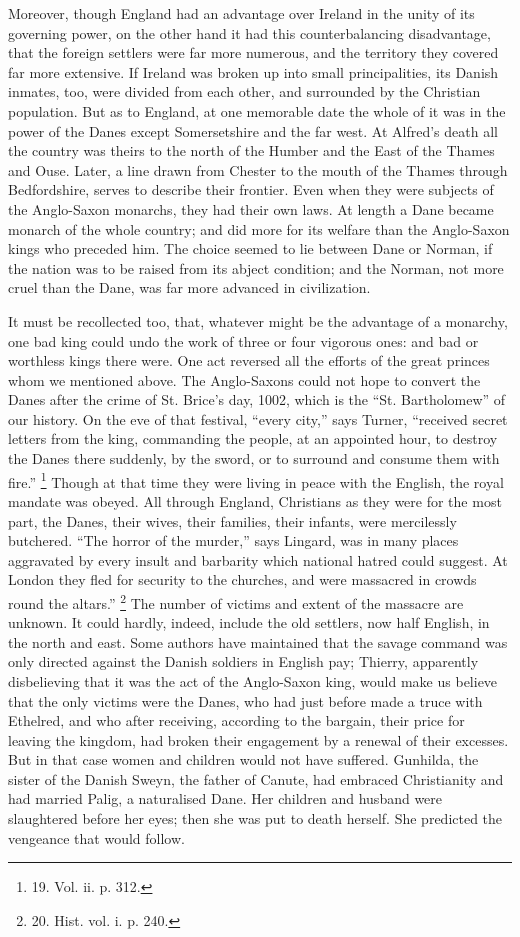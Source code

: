Moreover, though England had
an advantage over Ireland in the unity of its governing power, on the
other hand it had this counterbalancing disadvantage, that the foreign
settlers were far more numerous, and the territory they covered far
more extensive. If Ireland was broken up into small principalities,
its Danish inmates, too, were divided from each other, and surrounded
by the Christian population. But as to England, at one memorable date
the whole of it was in the power of the Danes except Somersetshire and
the far west. At Alfred's death all the country was theirs to the
north of the Humber and the East of the Thames and Ouse. Later, a line
drawn from Chester to the mouth of the Thames through Bedfordshire,
serves to describe their frontier. Even when they were subjects of the
Anglo-Saxon monarchs, they had their own laws. At length a Dane became
monarch of the whole country; and did more for its welfare than the
Anglo-Saxon kings who preceded him. The choice seemed to lie between
Dane or Norman, if the nation was to be raised from its abject
condition; and the Norman, not more cruel than the Dane, was far more
advanced in civilization.

It must be recollected too,
that, whatever might be the advantage of a monarchy, one bad king
could undo the work of three or four vigorous ones: and bad or
worthless kings there were. One act reversed all the efforts of the
great princes whom we mentioned above. The Anglo-Saxons could not hope
to convert the Danes after the crime of St. Brice's day, 1002, which
is the ``St. Bartholomew'' of our history. On the eve of that festival, ``every
city,'' says Turner, ``received secret letters from the king, commanding
the people, at an appointed hour, to destroy the Danes there suddenly,
by the sword, or to surround and consume them with fire.'' \footnote{19.
Vol. ii. p. 312.} Though at that time they were living in peace with the
English, the royal mandate was obeyed. All through England, Christians
as they were for the most part, the Danes, their wives, their
families, their infants, were mercilessly butchered. ``The horror of
the murder,'' says Lingard, was in many places aggravated by every
insult and barbarity which national hatred could suggest. At London
they fled for security to the churches, and were massacred in crowds
round the altars.'' \footnote{20.
Hist. vol. i. p. 240.} The
number of victims and extent of the massacre are unknown. It could
hardly, indeed, include the old settlers, now half English, in the
north and east. Some authors have maintained that the savage command
was only directed against the Danish soldiers in English pay; Thierry,
apparently disbelieving that it was the act of the Anglo-Saxon king,
would make us believe that the only victims were the Danes, who had
just before made a truce with Ethelred, and who after receiving,
according to the bargain, their price for leaving the kingdom, had
broken their engagement by a renewal of their excesses. But in that
case women and children would not have suffered. Gunhilda, the sister
of the Danish Sweyn, the father of Canute, had embraced Christianity
and had married Palig, a naturalised Dane. Her children and husband
were slaughtered before her eyes; then she was put to death herself.
She predicted the vengeance that would follow.

